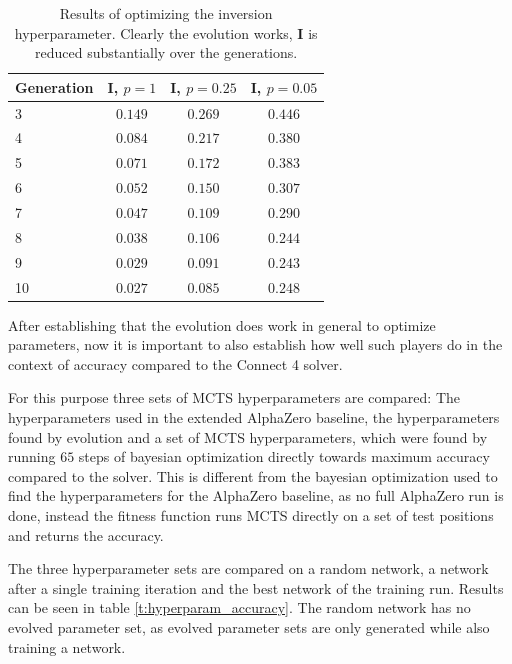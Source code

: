 \documentclass[12pt,onecolumn,oneside,titlepage]{article}
\begin{document}
\begin{table} [H]
 \centering
  \begin{tabular}{ l | c c c }
  Generation & $\mathbf{I}$, $p = 1$ & $\mathbf{I}$, $p = 0.25$ & $\mathbf{I}$, $p = 0.05$ \\
  \hline
  3 & $0.149$ & $0.269$ & $0.446$ \\
  4 & $0.084$ & $0.217$ & $0.380$ \\
  5 & $0.071$ & $0.172$ & $0.383$ \\
  6 & $0.052$ & $0.150$ & $0.307$ \\
  7 & $0.047$ & $0.109$ & $0.290$ \\
  8 & $0.038$ & $0.106$ & $0.244$ \\
  9 & $0.029$ & $0.091$ & $0.243$ \\
  10 & $0.027$ & $0.085$ & $0.248$ \\
  \end{tabular}
  \caption{Results of optimizing the inversion hyperparameter. Clearly the evolution works, $\mathbf{I}$ is reduced substantially over the generations.}
  \label{t:inversion_results}
\end{table}


After establishing that the evolution does work in general to optimize parameters, now it is important to also establish how well such players do in the context of accuracy compared to the Connect 4 solver.

For this purpose three sets of MCTS hyperparameters are compared: The hyperparameters used in the extended AlphaZero baseline, the hyperparameters found by evolution and a set of MCTS hyperparameters, which were found by running $65$ steps of bayesian optimization
directly towards maximum accuracy compared to the solver. This is different from the bayesian optimization used to find the hyperparameters for the AlphaZero baseline, as no full AlphaZero run is done, instead the fitness function runs MCTS directly on a set of test positions and returns
the accuracy.

The three hyperparameter sets are compared on a random network, a network after a single training iteration and the best network of the training run. Results can be seen in table \ref{t:hyperparam_accuracy}. The random network has no evolved
parameter set, as evolved parameter sets are only generated while also training a network.
\end{document}
